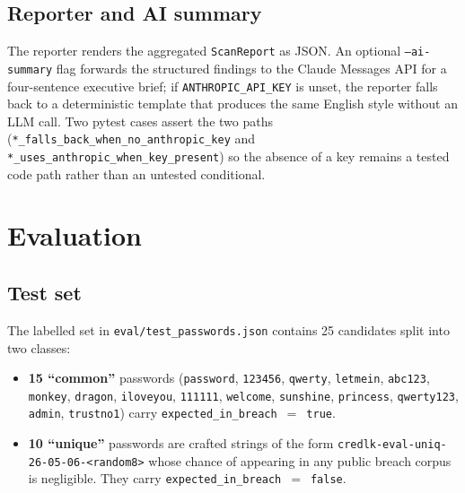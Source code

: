 \documentclass[conference]{IEEEtran}
\begin{document}
\subsection{Reporter and AI summary}
The reporter renders the aggregated \texttt{ScanReport} as JSON. An
optional \texttt{--ai-summary} flag forwards the structured findings
to the Claude Messages API for a four-sentence executive brief; if
\texttt{ANTHROPIC\_API\_KEY} is unset, the reporter falls back to a
deterministic template that produces the same English style without
an LLM call. Two pytest cases assert the two paths
(\texttt{*\_falls\_back\_when\_no\_anthropic\_key} and
\texttt{*\_uses\_anthropic\_when\_key\_present}) so the absence of a key
remains a tested code path rather than an untested conditional.

\section{Evaluation}

\subsection{Test set}
The labelled set in \texttt{eval/test\_passwords.json} contains 25
candidates split into two classes:
\begin{itemize}
  \item \textbf{15 ``common''} passwords (\texttt{password},
        \texttt{123456}, \texttt{qwerty}, \texttt{letmein},
        \texttt{abc123}, \texttt{monkey}, \texttt{dragon},
        \texttt{iloveyou}, \texttt{111111}, \texttt{welcome},
        \texttt{sunshine}, \texttt{princess}, \texttt{qwerty123},
        \texttt{admin}, \texttt{trustno1}) carry
        \texttt{expected\_in\_breach}~$=$~\texttt{true}.
  \item \textbf{10 ``unique''} passwords are crafted strings of the
        form \texttt{credlk-eval-uniq-26-05-06-<random8>} whose chance
        of appearing in any public breach corpus is negligible. They
        carry \texttt{expected\_in\_breach}~$=$~\texttt{false}.
\end{itemize}
\end{document}
